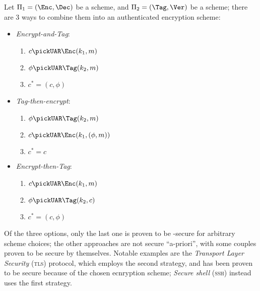 Let $\Pi_1 = (\Enc, \Dec)$ be a \ske{} scheme, and $\Pi_2 = (\Tag, \Ver)$ be a \mac{} scheme; there are 3 ways to combine them into an authenticated encryption scheme:
\begin{itemize}
    \item \emph{Encrypt-and-Tag}:
    \begin{enumerate}
        \item $c \pickUAR \Enc(k_1, m)$
        \item $\phi \pickUAR \Tag(k_2, m)$
        \item $c^* = (c, \phi)$
    \end{enumerate}
        
    \item \emph{Tag-then-encrypt}:
    \begin{enumerate}
        \item $\phi \pickUAR \Tag(k_2, m)$
        \item $c \pickUAR \Enc(k_1, (\phi, m))$
        \item $c^* = c$
    \end{enumerate}

    \item \emph{Encrypt-then-Tag}:
    \begin{enumerate}
        \item $c \pickUAR \Enc(k_1, m)$
        \item $\phi \pickUAR \Tag(k_2, c)$
        \item $c^* = (c, \phi)$
    \end{enumerate}
\end{itemize}

Of the three options, only the last one is proven to be \cca-secure for arbitrary scheme choices; the other approaches are not secure ``a-priori'', with some couples proven to be secure by themselves. Notable examples are the \emph{Transport Layer Security} (\textsc{tls}) protocol, which employs the second strategy, and has been proven to be secure because of the chosen ecnryption scheme; \emph{Secure shell} (\textsc{ssh}) instead uses the first strategy.

